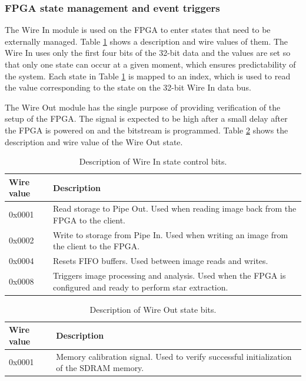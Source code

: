 \documentclass[12pt]{report}
\begin{document}
\subsubsection{FPGA state management and event triggers}
The Wire In module is used on the FPGA to enter states that need to be externally managed. Table \ref{table:wireInState} shows a description and wire values of them. The Wire In uses only the first four bits of the 32-bit data and the values are set so that only one state can occur at a given moment, which ensures predictability of the system. Each state in Table \ref*{table:wireInState} is mapped to an index, which is used to read the value corresponding to the state on the 32-bit Wire In data bus.
\par
The Wire Out module has the single purpose of providing verification of the setup of the FPGA. The signal is expected to be high after a small delay after the FPGA is powered on and the bitstream is programmed. Table \ref*{table:wireOutState} shows the description and wire value of the Wire Out state.

\begin{table}[h]
    \begin{tabular}{|p{3cm}|p{10cm}|}
        \hline
        \textbf{Wire value}&\textbf{Description}\\
        \hline
        0x0001&Read storage to Pipe Out. Used when reading image back from the FPGA to the client.\\
        \hline
        0x0002&Write to storage from Pipe In. Used when writing an image from the client to the FPGA.\\ 
        \hline
        0x0004&Resets FIFO buffers. Used between image reads and writes. \\
        \hline
        0x0008&Triggers image processing and analysis. Used when the FPGA is configured and ready to perform star extraction.\\
        \hline
    \end{tabular}
    \caption{Description of Wire In state control bits.}
    \label{table:wireInState}
\end{table}
\begin{table}[h]
    \begin{tabular}{|p{3cm}|p{10cm}|}
        \hline
        \textbf{Wire value}&\textbf{Description}\\
        \hline
        0x0001&Memory calibration signal. Used to verify successful initialization of the SDRAM memory.\\
        \hline
    \end{tabular}
    \caption{Description of Wire Out state bits.}
    \label{table:wireOutState}
\end{table}
\end{document}
